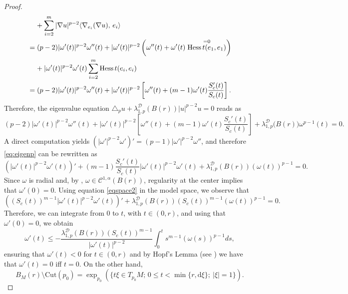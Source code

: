 \documentclass{article}
\begin{document}
\begin{proof}
\begin{equation*}
\begin{aligned}
    & \; \; \; \; +  \sum_{i=2}^{m}| \nabla u |^{p-2}\langle \nabla_{e_i}( \nabla u),\, e_i\rangle \\
&= (p-2)|\omega'(t)|^{p-2} \omega''(t)+|\omega'(t)|^{p-2}\left(\omega''(t)+\omega'(t)\stackrel{=0}{{\rm Hess} \,t(e_1,e_1)}\right) \\ 
& \; \; \; \; + |\omega'(t)|^{p-2}\omega'(t)\sum_{i=2}^{m}{\rm Hess} \, t(e_i,e_i) \\
    &= (p-2)|\omega'(t)|^{p-2}\omega''(t)+|\omega'(t)|^{p-2} \left[  \omega''(t)+ (m-1)\omega'(t) \frac{S_{c}'(t)}{S_{c}(t)}\right].
    \end{aligned}
\end{equation*}
Therefore, the eigenvalue equation $\triangle_p u +\lambda_{1,p}^{\mathcal{D}}(B(r))| u |^{p-2}u=0$ reads as
\begin{equation}\label{eq:eigenp}
    (p-2) |\omega'(t)|^{p-2}\omega''(t)+|\omega'(t)|^{p-2}\left[  \omega''(t) + (m-1) \omega'(t) \frac{S_{c}'(t)}{S_{c}(t)}\right]+ \lambda_{1,p}^{\mathcal{D}}\big(B(r)\big)\omega^{p-1}(t)=0.
\end{equation}
A direct computation yields $\left(|\omega'|^{p-2}\omega'\right)' = (p-1)|\omega'|^{p-2}\omega''$, and therefore \eqref{eq:eigenp} can be rewritten as
\begin{equation}\label{eqspace2}
\left( |\omega'(t)|^{p-2} \omega'(t) \right)' + (m-1) \frac{S_{c}'(t)}{S_{c}(t)} |\omega'(t)|^{p-2} \omega'(t)   + \lambda_{1,p}^{\mathcal{D}}(B(r))(\omega(t))^{p-1}=0.
\end{equation}
Since $\omega$ is radial and, by \cite[Lemma 5]{le}, $\omega \in \mathcal{C}^{1,\alpha}(B(r))$, regularity at the center implies that $\omega'(0)=0$. Using equation \eqref{eqspace2} in the model space, we observe that
\begin{equation*}
\left( (S_{c}(t))^{m-1}|\omega'(t)|^{p-2} \omega'(t) \right)'  +\lambda_{1,p}^{\mathcal{D}}(B(r))(S_{c}(t))^{m-1}(\omega(t))^{p-1}=0.
\end{equation*}
Therefore, we can integrate from $0$ to $t$, with $t \in (0,r)$, and using that $\omega'(0)=0$, we obtain
\begin{equation*}
    \omega'(t) \leq -\frac{\lambda_{1,p}^{\mathcal{D}}(B(r))(S_{c}(t))^{m-1}}{|\omega'(t)|^{p-2}}\int_0^{t} s^{m-1}(\omega(s))^{p-1}ds,
\end{equation*}
ensuring that $\omega'(t) < 0$ for $t \in (0,r)$ and by Hopf's Lemma (see \cite[Theorem 5]{Vazquez}) we have that $\omega'(t)=0$ iff $t=0$. On the other hand,
\[ B_M(r) \setminus \mathrm{Cut}(p_0) = \exp_{p_0} ( \{ t \xi \in T_{p_0}M; \, 0 \leq t < \min \{r,\text{d}\xi \}; \ | \xi |=1 \} ). \]

\end{proof}
\end{document}
